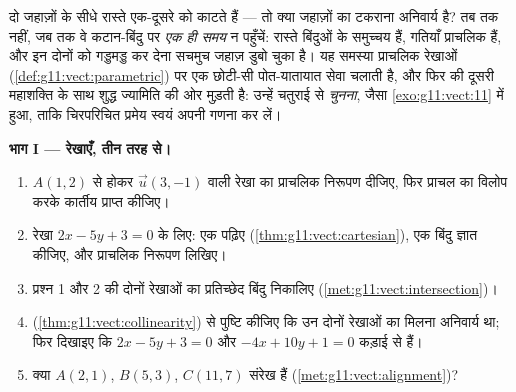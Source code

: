\begin{problem}
\label{pb:g11:vect:1}
दो जहाज़ों के सीधे रास्ते एक-दूसरे को काटते हैं --- तो क्या जहाज़ों का टकराना
अनिवार्य है? तब तक नहीं, जब तक वे कटान-बिंदु पर \emph{एक ही समय} न पहुँचें:
रास्ते बिंदुओं के समुच्चय हैं, गतियाँ प्राचलिक हैं, और इन दोनों को गड्डमड्ड
कर देना सचमुच जहाज़ डुबो चुका है। यह समस्या प्राचलिक रेखाओं (\cref{def:g11:vect:parametric}) पर एक
छोटी-सी पोत-यातायात सेवा चलाती है, और फिर  की दूसरी महाशक्ति के
साथ शुद्ध ज्यामिति की ओर मुड़ती है: उन्हें चतुराई से \emph{चुनना}, जैसा \cref{exo:g11:vect:11}
में हुआ, ताकि चिरपरिचित प्रमेय स्वयं अपनी गणना कर लें।

\medskip
\noindent\textbf{भाग I --- रेखाएँ, तीन तरह से।}
\begin{enumerate}
  \item $A(1, 2)$ से होकर  $\vec u(3, -1)$ वाली रेखा का प्राचलिक निरूपण दीजिए,
        फिर प्राचल का विलोप करके कार्तीय  प्राप्त कीजिए।
  \item रेखा $2x - 5y + 3 = 0$ के लिए: एक  पढ़िए (\cref{thm:g11:vect:cartesian}), एक बिंदु ज्ञात
        कीजिए, और प्राचलिक निरूपण लिखिए।
  \item प्रश्न 1 और 2 की दोनों रेखाओं का प्रतिच्छेद बिंदु निकालिए (\cref{met:g11:vect:intersection})।
  \item {} (\cref{thm:g11:vect:collinearity}) से पुष्टि कीजिए कि उन दोनों रेखाओं का मिलना अनिवार्य
        था; फिर दिखाइए कि $2x - 5y + 3 = 0$ और $-4x + 10y + 1 = 0$ कड़ाई से  हैं।
  \item क्या $A(2, 1)$, $B(5, 3)$, $C(11, 7)$ संरेख हैं (\cref{met:g11:vect:alignment})?
\end{enumerate}


\end{problem}
